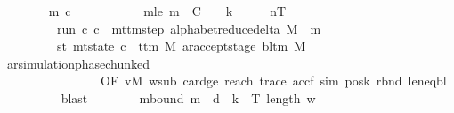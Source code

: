 \begin{isabellebody}
\ \ \ \ \ \ \isamarkupfalse%
\ m\ c{\isacharprime}{\kern0pt}{\isacharprime}{\kern0pt}\ \isanewline
\ \ \ \ \ \ \ \ \ \ m{\isacharunderscore}{\kern0pt}le{\isacharcolon}{\kern0pt}\ {\isachardoublequoteopen}m\ {\isasymle}\ {\isacharparenleft}{\kern0pt}{\isacharquery}{\kern0pt}C\ {\isacharasterisk}{\kern0pt}\ {\isacharparenleft}{\kern0pt}{}\ {\isacharasterisk}{\kern0pt}\ {\isacharquery}{\kern0pt}k\ {\isacharplus}{\kern0pt}\ {}{\isacharparenright}{\kern0pt}\ {\isacharplus}{\kern0pt}\ {}{\isacharparenright}{\kern0pt}\ {\isacharasterisk}{\kern0pt}\ n{\isacharunderscore}{\kern0pt}T{\isachardoublequoteclose}\isanewline
\ \ \ \ \ \ \ \ \ run{\isacharcolon}{\kern0pt}\ {\isachardoublequoteopen}{\isacharparenleft}{\kern0pt}{\isacharquery}{\kern0pt}c{\isacharprime}{\kern0pt}{\isacharcomma}{\kern0pt}\ c{\isacharprime}{\kern0pt}{\isacharprime}{\kern0pt}{\isacharparenright}{\kern0pt}\ {\isasymin}\ {\isacharparenleft}{\kern0pt}mttm{\isacharunderscore}{\kern0pt}step\ {\isacharparenleft}{\kern0pt}alphabet{\isacharunderscore}{\kern0pt}reduce{\isacharunderscore}{\kern0pt}delta\ M{\isacharparenright}{\kern0pt}{\isacharparenright}{\kern0pt}\ {\isacharcircum}{\kern0pt}{\isacharcircum}{\kern0pt}\ m{\isachardoublequoteclose}\isanewline
\ \ \ \ \ \ \ \ \ st{\isacharprime}{\kern0pt}{\isacharprime}{\kern0pt}{\isacharcolon}{\kern0pt}\ {\isachardoublequoteopen}mt{\isacharunderscore}{\kern0pt}state\ c{\isacharprime}{\kern0pt}{\isacharprime}{\kern0pt}\ {\isacharequal}{\kern0pt}\ {\isacharparenleft}{\kern0pt}t{\isacharunderscore}{\kern0pt}tm\ M{\isacharcomma}{\kern0pt}\ ar{\isacharunderscore}{\kern0pt}accept{\isacharunderscore}{\kern0pt}stage\ {\isacharparenleft}{\kern0pt}bl{\isacharunderscore}{\kern0pt}tm\ M{\isacharparenright}{\kern0pt}{\isacharparenright}{\kern0pt}{\isachardoublequoteclose}\isanewline
\ \ \ \ \ \ \ \ \isamarkupfalse%
\ ar{\isacharunderscore}{\kern0pt}simulation{\isacharunderscore}{\kern0pt}phase{\isacharunderscore}{\kern0pt}chunked\isanewline
\ \ \ \ \ \ \ \ \ \ \ \ \ \ \ \ {\isacharbrackleft}{\kern0pt}OF\ vM\ w{\isacharunderscore}{\kern0pt}sub\ card{\isacharunderscore}{\kern0pt}ge\ reach{}\ trace\ accf\ sim\ posk\ rbnd\ le{\isacharunderscore}{\kern0pt}neq{\isacharunderscore}{\kern0pt}bl{\isacharbrackright}{\kern0pt}\isanewline
\ \ \ \ \ \ \ \ \isamarkupfalse%
\ blast\isanewline
\ \ \ \ \ \ \isamarkupfalse%
\ m{\isacharunderscore}{\kern0pt}bound{\isacharcolon}{\kern0pt}\ {\isachardoublequoteopen}m\ {\isasymle}\ {\isacharquery}{\kern0pt}d\ {\isacharasterisk}{\kern0pt}\ {\isacharquery}{\kern0pt}k\ {\isacharasterisk}{\kern0pt}\ T\ {\isacharparenleft}{\kern0pt}length\ w{\isacharparenright}{\kern0pt}{\isachardoublequoteclose}\isanewline

\end{isabellebody}
